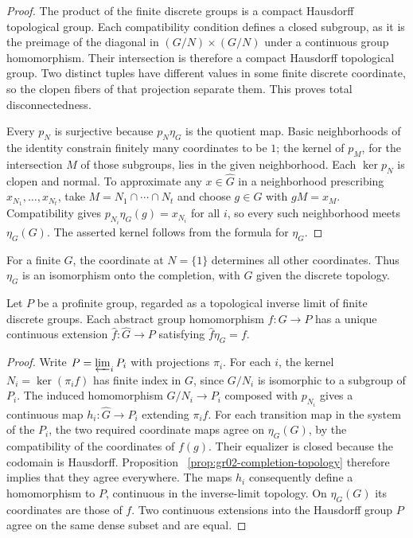 \begin{proof}
The product of the finite discrete groups is a compact Hausdorff
topological group. Each compatibility condition defines a closed
subgroup, as it is the preimage of the diagonal in
\((G/N)\times(G/N)\) under a continuous group homomorphism. Their
intersection is therefore a compact Hausdorff topological group.
Two distinct tuples have different values in some finite discrete
coordinate, so the clopen fibers of that projection separate them.
This proves total disconnectedness.

Every \(p_N\) is surjective because \(p_N\eta_G\) is the quotient
map. Basic neighborhoods of the identity constrain finitely many
coordinates to be \(1\); the kernel of \(p_M\), for the intersection
\(M\) of those subgroups, lies in the given neighborhood. Each
\(\ker p_N\) is clopen and normal. To approximate any
\(x\in\widehat G\) in a neighborhood prescribing \(x_{N_1},\ldots,x_{N_t}\),
take \(M=N_1\cap\cdots\cap N_t\) and choose \(g\in G\) with
\(gM=x_M\). Compatibility gives \(p_{N_i}\eta_G(g)=x_{N_i}\) for all
\(i\), so every such neighborhood meets \(\eta_G(G)\).
The asserted kernel follows from the formula for \(\eta_G\).
\end{proof}

For a finite \(G\), the coordinate at \(N=\{1\}\) determines all
other coordinates. Thus \(\eta_G\) is an isomorphism onto the
completion, with \(G\) given the discrete topology.

\begin{theorem}
\label{thm:gr02-completion-universal}
Let \(P\) be a profinite group, regarded as a topological inverse
limit of finite discrete groups. Each abstract group homomorphism
\(f\colon G\to P\) has a unique continuous extension
\(\widehat f\colon\widehat G\to P\) satisfying
\(\widehat f\eta_G=f\).
\end{theorem}

\begin{proof}
Write \(P=\varprojlim_i P_i\) with projections \(\pi_i\). For each
\(i\), the kernel \(N_i=\ker(\pi_i f)\) has finite index in \(G\),
since \(G/N_i\) is isomorphic to a subgroup of \(P_i\).
The induced homomorphism \(G/N_i\to P_i\) composed with \(p_{N_i}\)
gives a continuous map \(h_i\colon\widehat G\to P_i\) extending
\(\pi_i f\). For each transition map in the system of the \(P_i\),
the two required coordinate maps agree on \(\eta_G(G)\), by the
compatibility of the coordinates of \(f(g)\). Their equalizer is
closed because the codomain is Hausdorff. Proposition~%
\ref{prop:gr02-completion-topology} therefore implies that they
agree everywhere. The maps \(h_i\) consequently define a
homomorphism to \(P\), continuous in the inverse-limit topology.
On \(\eta_G(G)\) its coordinates are those of \(f\).
Two continuous extensions into the Hausdorff group \(P\) agree on
the same dense subset and are equal.
\end{proof}

